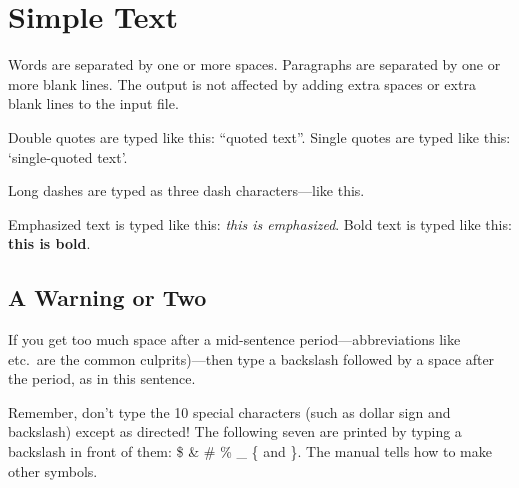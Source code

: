 \documentclass[12pt,a4paper]{article}  %
\begin{document}
\section{Simple Text}                  %

Words are separated by one or more spaces.  Paragraphs are separated by
one or more blank lines.  The output is not affected by adding extra
spaces or extra blank lines to the input file.

Double quotes are typed like this: ``quoted text''.
Single quotes are typed like this: `single-quoted text'.

Long dashes are typed as three dash characters---like this.

Emphasized text is typed like this: \emph{this is emphasized}.
Bold       text is typed like this: \textbf{this is bold}.

\subsection{A Warning or Two}  %

If you get too much space after a mid-sentence period---abbreviations
like etc.\ are the common culprits)---then type a backslash followed by
a space after the period, as in this sentence.

Remember, don't type the 10 special characters (such as dollar sign and
backslash) except as directed!  The following seven are printed by
typing a backslash in front of them:  \$  \&  \#  \%  \_  \{  and  \}.  
The manual tells how to make other symbols.
\end{document}
